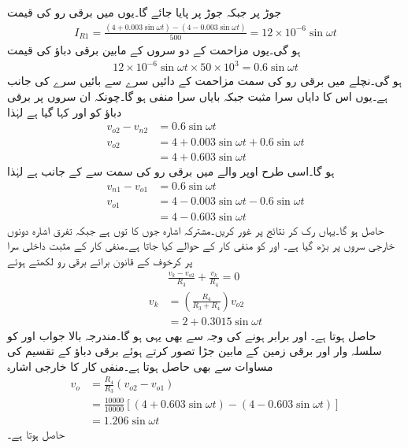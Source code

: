 جوڑ  پر  جبکہ جوڑ  پر  پایا جائے گا۔یوں  میں برقی رو کی قیمت
\begin{align*}
I_{R1}=\frac{\left(4+0.003 \sin \omega t \right)-\left(4-0.003 \sin \omega t \right)}{500}=12 \times 10^{-6} \sin \omega t
\end{align*}
 ہو گی۔یوں مزاحمت  کے دو سروں کے مابین برقی دباؤ  کی قیمت
\begin{align*}
12 \times 10^{-6} \sin \omega t \times 50 \times 10^3=0.6 \sin \omega t
\end{align*}
ہو گی۔نچلے  میں برقی رو کی سمت مزاحمت کے دائیں سرے سے بائیں سرے کی جانب ہے۔یوں اس کا دایاں سرا مثبت جبکہ بایاں سرا منفی ہو گا۔چونکہ ان سروں پر برقی دباؤ کو  اور  کہا گیا ہے لہٰذا
\begin{align*}
v_{o2}-v_{n2}&=0.6 \sin \omega t\\
v_{o2}&=4+0.003 \sin \omega t +0.6 \sin \omega t\\
&=4+0.603 \sin \omega t
\end{align*}
ہو گا۔اسی طرح اوپر والے  میں برقی رو کی سمت  سے  کے جانب ہے لہٰذا
\begin{align*}
v_{n1}-v_{o1}&=0.6 \sin \omega t\\
v_{o1}&=4-0.003 \sin \omega t -0.6 \sin \omega t\\
&=4-0.603 \sin \omega t
\end{align*}
حاصل ہو گا۔یہاں رک کر نتائج پر غور کریں۔مشترکہ اشارہ جوں کا توں ہے جبکہ تفرق اشارہ دونوں خارجی سروں  پر  بڑھ گیا ہے۔ اور  کو منفی کار کے حوالے کیا جاتا ہے۔منفی کار  کے مثبت داخلی سرا  پر کرخوف کے قانون برائے برقی رو لکھتے ہوئے
\begin{align*}
&\frac{v_k-v_{o2}}{R_3}+\frac{v_k}{R_4}=0\\
v_k&=\left(\frac{R_4}{R_3+R_4} \right) v_{o2}\\
&=2+0.3015 \sin \omega t
\end{align*}
حاصل ہوتا ہے۔ اور  برابر ہونے کی وجہ سے  بھی یہی ہو گا۔مندرجہ بالا جواب  اور  کو سلسلہ وار  اور برقی زمین کے مابین جڑا تصور کرتے ہوئے برقی دباؤ کے تقسیم کی مساوات سے بھی حاصل ہوتا ہے۔منفی کار کا خارجی اشارہ
\begin{align*}
v_o&=\frac{R_4}{R_3}{\left(v_{o2}-v_{o1} \right)}\\
&=\frac{10000}{10000} \left[\left(4+0.603 \sin \omega t\right)-\left(4-0.603 \sin \omega t \right) \right]\\
&=1.206 \sin \omega t
\end{align*}
حاصل ہوتا ہے۔

